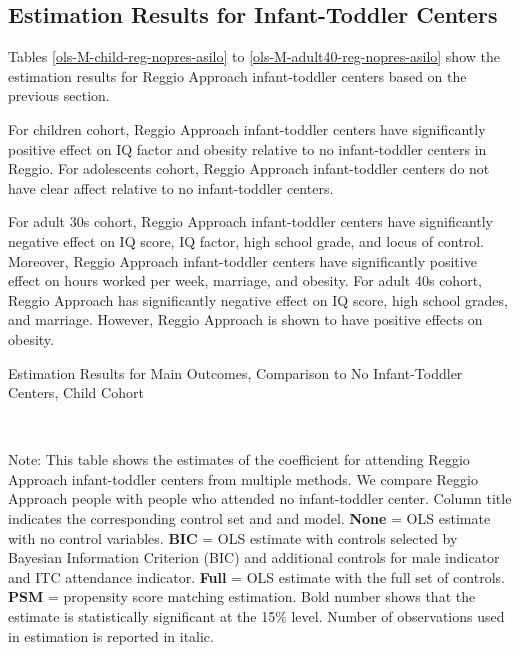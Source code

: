 

\subsection{Estimation Results for Infant-Toddler Centers}


Tables \ref{ols-M-child-reg-nopres-asilo} to \ref{ols-M-adult40-reg-nopres-asilo} show the estimation results for Reggio Approach infant-toddler centers based on the previous section. 

For children cohort, Reggio Approach infant-toddler centers have significantly positive effect on IQ factor and obesity relative to no infant-toddler centers in Reggio. For adolescents cohort, Reggio Approach infant-toddler centers do not have clear affect relative to no infant-toddler centers. 

For adult 30s cohort, Reggio Approach infant-toddler centers have significantly negative effect on IQ score, IQ factor, high school grade, and locus of control. Moreover, Reggio Approach infant-toddler centers have significantly positive effect on hours worked per week, marriage, and obesity. For adult 40s cohort, Reggio Approach has significantly negative effect on IQ score, high school grades, and marriage. However, Reggio Approach is shown to have positive effects on obesity. 


\begin{table}[H] \caption{Estimation Results for Main Outcomes, Comparison to No Infant-Toddler Centers, Child Cohort} \label{ols-M-child-reg-nopres-asilo}
\scalebox{0.8}{}
\vspace{1ex} \\
\footnotesize\raggedright{Note: This table shows the estimates of the coefficient for attending Reggio Approach infant-toddler centers from multiple methods. We compare Reggio Approach people with people who attended no infant-toddler center. Column title indicates the corresponding control set and and model.  \textbf{None} = OLS estimate with no control variables. \textbf{BIC} = OLS estimate with controls selected by Bayesian Information Criterion (BIC) and additional controls for male indicator and ITC attendance indicator. \textbf{Full} = OLS estimate with the full set of controls. \textbf{PSM} =  propensity score matching estimation. Bold number shows that the estimate is statistically significant at the 15\% level. Number of observations used in estimation is reported in italic.}

\end{table}

